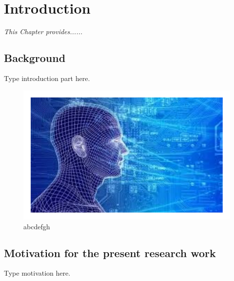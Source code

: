 \chapter{Introduction}
\label{C1} %
\graphicspath{{Figures/Chapter-1figs/PDF/}{Figures/Chapter-1figs/}}
\onehalfspacing
\textit{This Chapter provides...... }
\thispagestyle{empty}
\section{Background} \label{S1.1}
Type introduction part here. \cite{whygaussianity}
\begin{figure}[b!]
	\center	
	\includegraphics[scale=0.7]{fig1_1} 	
	\caption{abcdefgh} 
	\label{f1.1}	
\end{figure}  

\section{Motivation for the present research work} \label{S1.2} 
Type motivation here.
